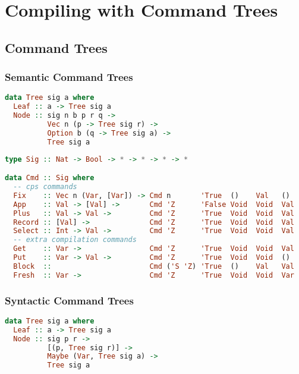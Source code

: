 
\chapter{\label{chap:treecomp}Compiling with Command Trees}
\section{\label{section:commandtree}Command Trees}
\subsection{\label{subsection:semantree}Semantic Command Trees}
\begin{lstlisting}[language=Haskell]
data Tree sig a where
  Leaf :: a -> Tree sig a
  Node :: sig n b p r q ->
          Vec n (p -> Tree sig r) ->
          Option b (q -> Tree sig a) ->
          Tree sig a
\end{lstlisting}

\begin{lstlisting}[language=Haskell]
type Sig :: Nat -> Bool -> * -> * -> * -> *

data Cmd :: Sig where
  -- cps commands
  Fix    :: Vec n (Var, [Var]) -> Cmd n       'True  ()    Val   ()
  App    :: Val -> [Val] ->       Cmd 'Z      'False Void  Void  Val 
  Plus   :: Val -> Val ->         Cmd 'Z      'True  Void  Void  Val
  Record :: [Val] ->              Cmd 'Z      'True  Void  Void  Val
  Select :: Int -> Val ->         Cmd 'Z      'True  Void  Void  Val
  -- extra compilation commands
  Get    :: Var ->                Cmd 'Z      'True  Void  Void  Val
  Put    :: Var -> Val ->         Cmd 'Z      'True  Void  Void  ()
  Block  ::                       Cmd ('S 'Z) 'True  ()    Val   Val
  Fresh  :: Var ->                Cmd 'Z      'True  Void  Void  Var
\end{lstlisting}

\subsection{\label{subsection:syntree}Syntactic Command Trees}

\begin{lstlisting}[language=Haskell]
data Tree sig a where
  Leaf :: a -> Tree sig a
  Node :: sig p r ->
          [(p, Tree sig r)] ->
          Maybe (Var, Tree sig a) ->
          Tree sig a
\end{lstlisting}


